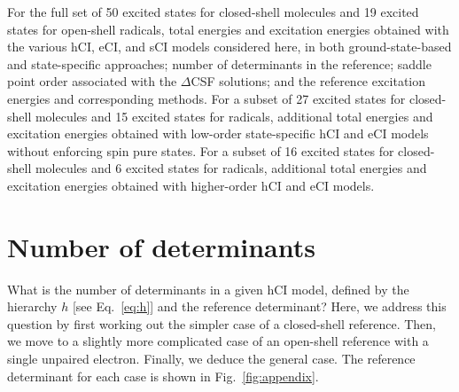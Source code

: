 \documentclass[aip,jcp,reprint,noshowkeys,superscriptaddress]{revtex4-1}
\begin{document}
For the full set of 50 excited states for closed-shell molecules and 19 excited states for open-shell radicals,
total energies and excitation energies obtained with
the various hCI, eCI, and sCI models considered here, in both ground-state-based and state-specific approaches;
number of determinants in the reference; saddle point order associated with the $\Delta$CSF solutions;
and the reference excitation energies and corresponding methods.
For a subset of 27 excited states for closed-shell molecules and 15 excited states for radicals,
additional total energies and excitation energies obtained with low-order state-specific hCI and eCI models without enforcing spin pure states.
For a subset of 16 excited states for closed-shell molecules and 6 excited states for radicals,
additional total energies and excitation energies obtained with higher-order hCI and eCI models.


\appendix

\section{Number of determinants}
\label{app:appendix}

What is the number of determinants in a given hCI model, defined by the hierarchy $h$ [see Eq.~\eqref{eq:h}] and the reference determinant?
Here, we address this question by first working out the simpler case of a closed-shell reference.
Then, we move to a slightly more complicated case of an open-shell reference with a single unpaired electron.
Finally, we deduce the general case.
The reference determinant for each case is shown in Fig.~\ref{fig:appendix}.
\end{document}
